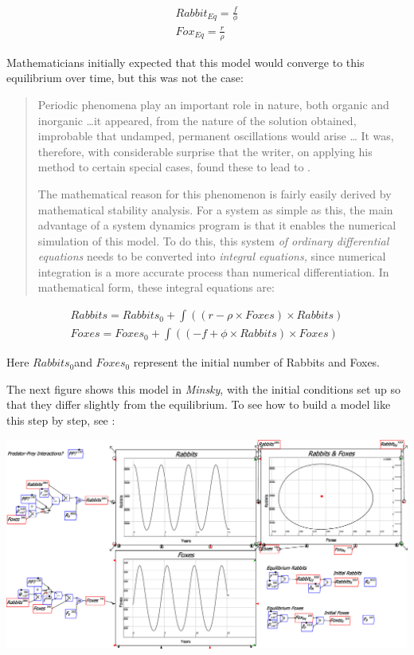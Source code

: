 \[
\begin{array}{c}
Rabbit_{Eq}=\frac{f}{\phi}\\
Fox_{Eq}=\frac{r}{\rho}
\end{array}
\]

Mathematicians initially expected that this model would converge to
this equilibrium over time, but this was not the case:
\begin{quotation}
Periodic phenomena play an important role in nature, both organic
and inorganic \ldots it appeared, from the nature of the solution
obtained, improbable that undamped, permanent oscillations would arise
\ldots{} It was, therefore, with considerable surprise that the writer,
on applying his method to certain special cases, found these to lead
to .

The mathematical reason for this phenomenon is fairly easily derived
by mathematical stability analysis. For a system as simple as this,
the main advantage of a system dynamics program is that it enables
the numerical simulation of this model. To do this, this system \emph{of
ordinary differential equations} needs to be converted into \emph{integral
equations,} since numerical integration is a more accurate process
than numerical differentiation. In mathematical form, these integral
equations are:
\end{quotation}
\[
\begin{array}{c}
Rabbits=Rabbits_{0}+\int\left(\left(r-\rho\times Foxes\right)\times Rabbits\right)\\
Foxes=Foxes_{0}+\int\left(\left(-f+\phi\times Rabbits\right)\times Foxes\right)
\end{array}
\]

Here $Rabbits_{0}$and $Foxes_{0}$ represent the initial number of
Rabbits and Foxes.

The next figure shows this model in \emph{Minsky}, with the initial
conditions set up so that they differ slightly from the equilibrium.
To see how to build a model like this step by step, see :

\noindent\includegraphics[width=\textwidth]{images/PredatorPreyRabbitsFoxes}


